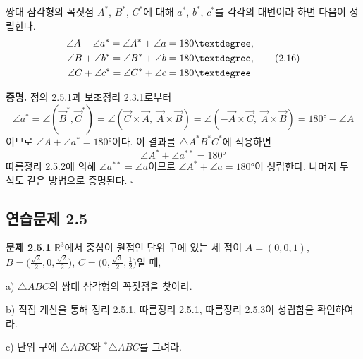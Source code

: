 \documentclass{article}
\begin{document}
\begin{tcolorbox}[
  colback=red!4, colframe=red!60!black,
  title=따름정리 2.5.3,
  fonttitle=\bfseries, boxrule=0.5mm, arc=3mm]

쌍대 삼각형의 꼭짓점 $A^*$, $B^*$, $C^*$에 대해 $a^*$, $b^*$, $c^*$를 각각의 대변이라 하면 다음이 성립한다.
\begin{align}
  \angle A + \angle a^* = \angle A^* + \angle a &= 180°, \notag\\
  \angle B + \angle b^* = \angle B^* + \angle b &= 180°, \tag{2.16}\\
  \angle C + \angle c^* = \angle C^* + \angle c &= 180° \notag
\end{align}

\end{tcolorbox}

\textbf{증명.}\quad
정의 2.5.1과 보조정리 2.3.1로부터
\[
  \angle a^*
  = \angle(\vec{B}^*,\vec{C}^*)
  = \angle(\vec{C}\times\vec{A},\;\vec{A}\times\vec{B})
  = \angle(-\vec{A}\times\vec{C},\;\vec{A}\times\vec{B})
  = 180° - \angle A
\]
이므로 $\angle A + \angle a^* = 180°$이다.
이 결과를 $\triangle A^*B^*C^*$에 적용하면
\begin{equation}
  \angle A^* + \angle a^{**} = 180° \tag{2.17}
\end{equation}
따름정리 2.5.2에 의해 $\angle a^{**} = \angle a$이므로 $\angle A^* + \angle a = 180°$이 성립한다.
나머지 두 식도 같은 방법으로 증명된다. \hfill $\square$

\subsection*{연습문제 2.5}

\textbf{문제 2.5.1}\quad
$\mathbb{R}^3$에서 중심이 원점인 단위 구에 있는 세 점이
$A = (0,0,1)$,\; $B = \bigl(\tfrac{\sqrt{2}}{2},0,\tfrac{\sqrt{2}}{2}\bigr)$,\; $C = \bigl(0,\tfrac{\sqrt{3}}{2},\tfrac{1}{2}\bigr)$일 때,

a) $\triangle ABC$의 쌍대 삼각형의 꼭짓점을 찾아라.

b) 직접 계산을 통해 정리 2.5.1, 따름정리 2.5.1, 따름정리 2.5.3이 성립함을 확인하여라.

c) 단위 구에 $\triangle ABC$와 ${}^*\!\triangle ABC$를 그려라.
\end{document}
